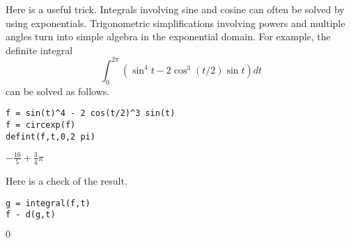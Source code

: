 
\bigskip
\noindent
Here is a useful trick.
Integrals involving sine and cosine
can often be solved by using exponentials.
Trigonometric simplifications involving powers
and multiple angles turn into simple algebra in the
exponential domain.
For example, the definite integral
$$\int_0^{2\pi}\left(\sin^4t-2\cos^3(t/2)\sin t\right)dt$$
can be solved as follows.

{\color{blue}
\begin{verbatim}
f = sin(t)^4 - 2 cos(t/2)^3 sin(t)
f = circexp(f)
defint(f,t,0,2 pi)
\end{verbatim}
}

\noindent
$\displaystyle -\tfrac{16}{5}+\tfrac{3}{4}\pi$

\bigskip
\noindent
Here is a check of the result.

{\color{blue}
\begin{verbatim}
g = integral(f,t)
f - d(g,t)
\end{verbatim}
}

\noindent
$\displaystyle 0$
